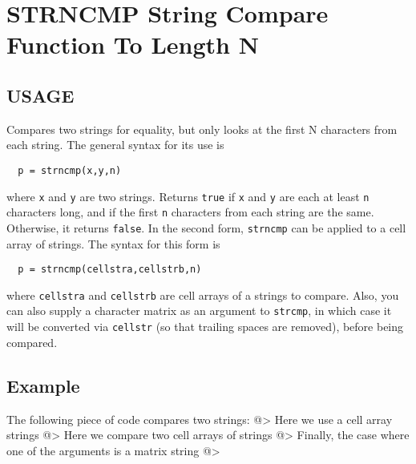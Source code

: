\section{STRNCMP String Compare Function To Length N }

\subsection{USAGE}

Compares two strings for equality, but only looks at the
first N characters from each string.  The general syntax 
for its use is
\begin{verbatim}
  p = strncmp(x,y,n)
\end{verbatim}
where \verb|x| and \verb|y| are two strings.  Returns \verb|true| if \verb|x|
and \verb|y| are each at least \verb|n| characters long, and if the
first \verb|n| characters from each string are the same.  Otherwise,
it returns \verb|false|.
In the second form, \verb|strncmp| can be applied to a cell array of
strings.  The syntax for this form is
\begin{verbatim}
  p = strncmp(cellstra,cellstrb,n)
\end{verbatim}
where \verb|cellstra| and \verb|cellstrb| are cell arrays of a strings
to compare.  Also, you can also supply a character matrix as
an argument to \verb|strcmp|, in which case it will be converted
via \verb|cellstr| (so that trailing spaces are removed), before being
compared.
\subsection{Example}

The following piece of code compares two strings:
@>
Here we use a cell array strings
@>
Here we compare two cell arrays of strings
@>
Finally, the case where one of the arguments is a matrix
string
@>
